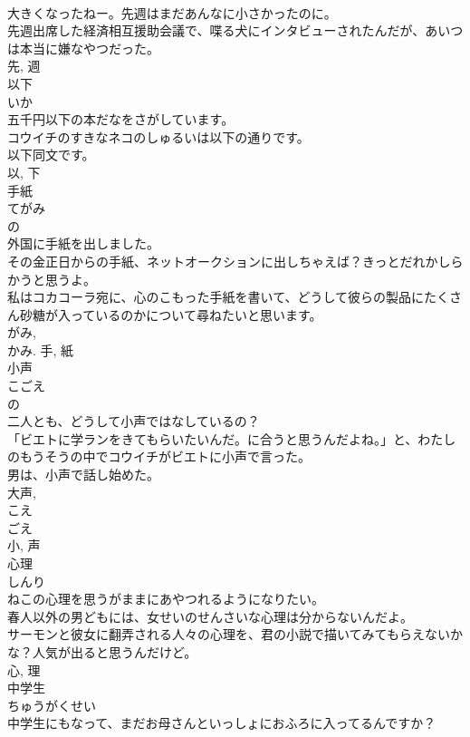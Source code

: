 \documentclass[8pt]{extreport}
\begin{document}
\begin{CJK}{UTF8}{min}
\\	大きくなったねー。先週はまだあんなに小さかったのに。	
\\	先週出席した経済相互援助会議で、喋る犬にインタビューされたんだが、あいつは本当に嫌なやつだった。	
\\	先, 週	
\\	以下	
\\	いか	
\\	五千円以下の本だなをさがしています。	
\\	コウイチのすきなネコのしゅるいは以下の通りです。	
\\	以下同文です。	
\\	以, 下	
\\	手紙	
\\	てがみ	
\\	の 
\\	外国に手紙を出しました。	
\\	その金正日からの手紙、ネットオークションに出しちゃえば？きっとだれかしらかうと思うよ。	
\\	私はコカコーラ宛に、心のこもった手紙を書いて、どうして彼らの製品にたくさん砂糖が入っているのかについて尋ねたいと思います。	
\\	がみ, 
\\	かみ.	手, 紙	
\\	小声	
\\	こごえ	
\\	の 
\\	二人とも、どうして小声ではなしているの？	
\\	「ビエトに学ランをきてもらいたいんだ。に合うと思うんだよね。」と、わたしのもうそうの中でコウイチがビエトに小声で言った。	
\\	男は、小声で話し始めた。	
\\	大声, 
\\	こえ 
\\	ごえ 
\\	小, 声	
\\	心理	
\\	しんり	
\\	ねこの心理を思うがままにあやつれるようになりたい。	
\\	春人以外の男どもには、女せいのせんさいな心理は分からないんだよ。	
\\	サーモンと彼女に翻弄される人々の心理を、君の小説で描いてみてもらえないかな？人気が出ると思うんだけど。	
\\	心, 理	
\\	中学生	
\\	ちゅうがくせい	
\\	中学生にもなって、まだお母さんといっしょにおふろに入ってるんですか？	

\end{CJK}
\end{document}
